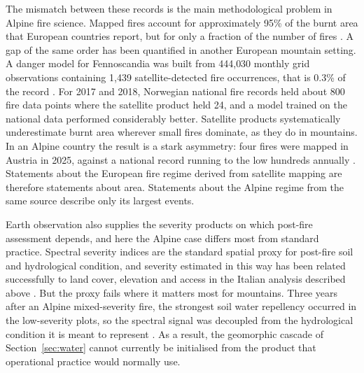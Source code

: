 \documentclass[11pt,a4paper]{article}
\begin{document}
The mismatch between these records is the main methodological problem in Alpine fire science. Mapped fires account for approximately 95\% of the burnt area that European countries report, but for only a fraction of the number of fires \citep{jrc_advance_2026}. A gap of the same order has been quantified in another European mountain setting. A danger model for Fennoscandia was built from 444{,}030 monthly grid observations containing 1{,}439 satellite-detected fire occurrences, that is 0.3\% of the record \citep{bakke_datadriven_2023}. For 2017 and 2018, Norwegian national fire records held about 800 fire data points where the satellite product held 24, and a model trained on the national data performed considerably better. Satellite products systematically underestimate burnt area wherever small fires dominate, as they do in mountains. In an Alpine country the result is a stark asymmetry: four fires were mapped in Austria in 2025, against a national record running to the low hundreds annually \citep{jrc_advance_2026, papathomakohle_towards_2025}. Statements about the European fire regime derived from satellite mapping are therefore statements about area. Statements about the Alpine regime from the same source describe only its largest events.

Earth observation also supplies the severity products on which post-fire assessment depends, and here the Alpine case differs most from standard practice. Spectral severity indices are the standard spatial proxy for post-fire soil and hydrological condition, and severity estimated in this way has been related successfully to land cover, elevation and access in the Italian analysis described above \citep{malandra_burn_2022}. But the proxy fails where it matters most for mountains. Three years after an Alpine mixed-severity fire, the strongest soil water repellency occurred in the low-severity plots, so the spectral signal was decoupled from the hydrological condition it is meant to represent \citep{negri_wildfire_2026}. As a result, the geomorphic cascade of Section~\ref{sec:water} cannot currently be initialised from the product that operational practice would normally use.
\end{document}
